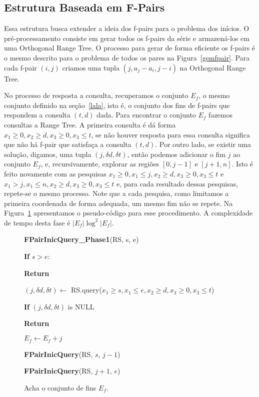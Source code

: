 \documentclass[12pt]{article}
\begin{document}
\subsection{Estrutura Baseada em F-Pairs}

Essa estrutura busca extender a ideia dos f-pairs para o problema dos inícios.
O pré-processamento consiste em gerar todos os f-pairs da série e armazená-los
em uma Orthogonal Range Tree. O processo para gerar de forma eficiente os f-pairs é o mesmo
descrito para o problema de todos os pares na Figura~\ref{gemfpair}. Para cada 
f-pair $(i, j)$ criamos uma tupla $(j, a_j - a_i, j - i)$ na Orthogonal Range Tree.

No processo de resposta a consulta, recuperamos o conjunto $E_f$, o mesmo
conjunto definido na seção~\ref{lala}, isto é, o conjunto dos fins de f-pairs que
respondem a consulta $(t, d)$ dada. Para encontrar o conjunto $E_f$ fazemos consultas a
Range Tree. A primeira consulta é dá forma $x_1 \ge 0,  x_2 \ge d,  x_3 \ge 0, x_3 \le t$, se não
houver resposta para essa consulta significa que não há f-pair que satisfaça a consulta $(t,d)$.
Por outro lado, se existir uma solução, digamos, uma tupla $(j, \delta d, \delta t)$, então
podemos adicionar o fim $j$ ao conjunto $E_f$, e, recursivamente, explorar as regiões $[0, j - 1]$ e $[j + 1, n]$.
Isto é feito novamente com as pesquisas $x_1 \ge 0, x_1 \le j, x_2 \ge d, x_3 \ge 0, x_3 \le t$ e 
$x_1 > j, x_1 \le n, x_2 \ge d, x_3 \ge 0, x_3 \le t$ e, para cada resultado dessas pesquisas, repete-se
o mesmo processo. Note que a cada pesquisa, como limitamos a primeira coordenada de forma adequada, um 
mesmo fim não se repete. Na Figura~\ref{fpairinicqueryphase1} apresentamos o pseudo-código para esse procedimento.
A complexidade de tempo desta fase é $|E_f| \log^2 |E_f|$.

\begin{figure}
\begin{framed}
{\bf FPairInicQuery\_Phase1}(RS, s, e)

\hspace{1cm} {\bf If } $s > e$:

\hspace{2cm} {\bf Return}

\hspace{1cm} $(j, \delta d, \delta t) \leftarrow $ RS.query($x_1 \ge s,  x_1 \le e,  x_2 \ge d,  x_3 \ge 0, x_3 \le t$)

\hspace{1cm} {\bf If} $(j, \delta d, \delta t)$ is NULL

\hspace{2cm} {\bf Return}

\hspace{1cm} $E_f \leftarrow E_f + j$

\hspace{1cm} {\bf FPairInicQuery}(RS, $s$, $j - 1$)

\hspace{1cm} {\bf FPairInicQuery}(RS, $j + 1$, $e$)

\end{framed}
\caption{Acha o conjunto de fins $E_f$.}
\label{fpairinicqueryphase1}
\end{figure}
\end{document}
